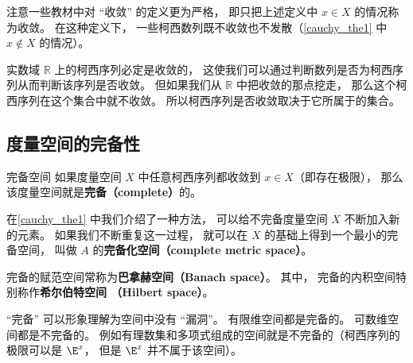 注意一些教材中对 “收敛” 的定义更为严格， 即只把上述定义中 $x \in X$ 的情况称为收敛。 在这种定义下， 一些柯西数列既不收敛也不发散（\autoref{cauchy_the1} 中 $x\notin X$ 的情况）。




实数域 $\mathbb R$ 上的柯西序列必定是收敛的， 这使我们可以通过判断数列是否为柯西序列从而判断该序列是否收敛。 但如果我们从 $\mathbb R$ 中把收敛的那点挖走， 那么这个柯西序列在这个集合中就不收敛。 所以柯西序列是否收敛取决于它所属于的集合。 %

\subsection{度量空间的完备性}

\begin{definition}{完备空间}
如果度量空间 $X$ 中任意柯西序列都收敛到 $x\in X$（即存在极限）， 那么该度量空间就是\textbf{完备（complete）}的。
\end{definition}

在\autoref{cauchy_the1} 中我们介绍了一种方法， 可以给不完备度量空间 $X$ 不断加入新的元素。 如果我们不断重复这一过程， 就可以在 $X$ 的基础上得到一个最小的完备空间， 叫做 $A$ 的\textbf{完备化空间（complete metric space）}。


完备的赋范空间常称为\textbf{巴拿赫空间（Banach space）}。 其中， 完备的内积空间特别称作\textbf{希尔伯特空间 （Hilbert space）}。

“完备” 可以形象理解为空间中没有 “漏洞”。 有限维空间都是完备的。 可数维空间都是不完备的。 例如有理数集和多项式组成的空间就是不完备的（柯西序列的极限可以是 $\E^x$， 但是 $\E^x$ 并不属于该空间）。
